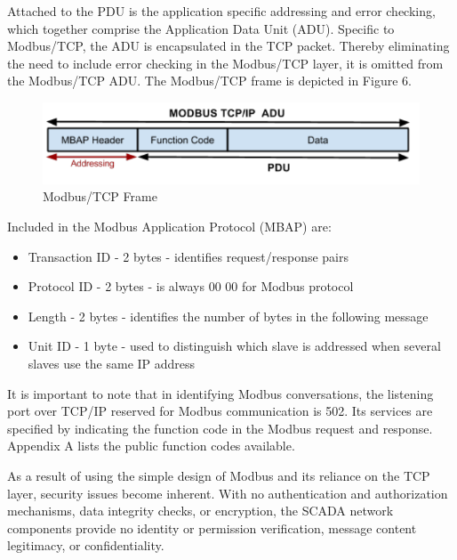 \documentclass[11pt,]{article}
\begin{document}
\clearpage

Attached to the PDU is the application specific addressing and error
checking, which together comprise the Application Data Unit (ADU).
Specific to Modbus/TCP, the ADU is encapsulated in the TCP packet.
Thereby eliminating the need to include error checking in the Modbus/TCP
layer, it is omitted from the Modbus/TCP ADU. The Modbus/TCP frame is
depicted in Figure 6.

\begin{figure}[bottom]

{\centering \includegraphics{thesis_files/figure-latex/unnamed-chunk-9-1} 

}

\caption{Modbus/TCP Frame}\label{fig:unnamed-chunk-9}
\end{figure}

Included in the Modbus Application Protocol (MBAP) are:

\begin{itemize}
\itemsep1pt\parskip0pt
\item
  Transaction ID - 2 bytes - identifies request/response pairs
\item
  Protocol ID - 2 bytes - is always 00 00 for Modbus protocol
\item
  Length - 2 bytes - identifies the number of bytes in the following
  message
\item
  Unit ID - 1 byte - used to distinguish which slave is addressed when
  several slaves use the same IP address
\end{itemize}

It is important to note that in identifying Modbus conversations, the
listening port over TCP/IP reserved for Modbus communication is 502. Its
services are specified by indicating the function code in the Modbus
request and response. Appendix A lists the public function codes
available.

As a result of using the simple design of Modbus and its reliance on the
TCP layer, security issues become inherent. With no authentication and
authorization mechanisms, data integrity checks, or encryption, the
SCADA network components provide no identity or permission verification,
message content legitimacy, or confidentiality.
\end{document}
